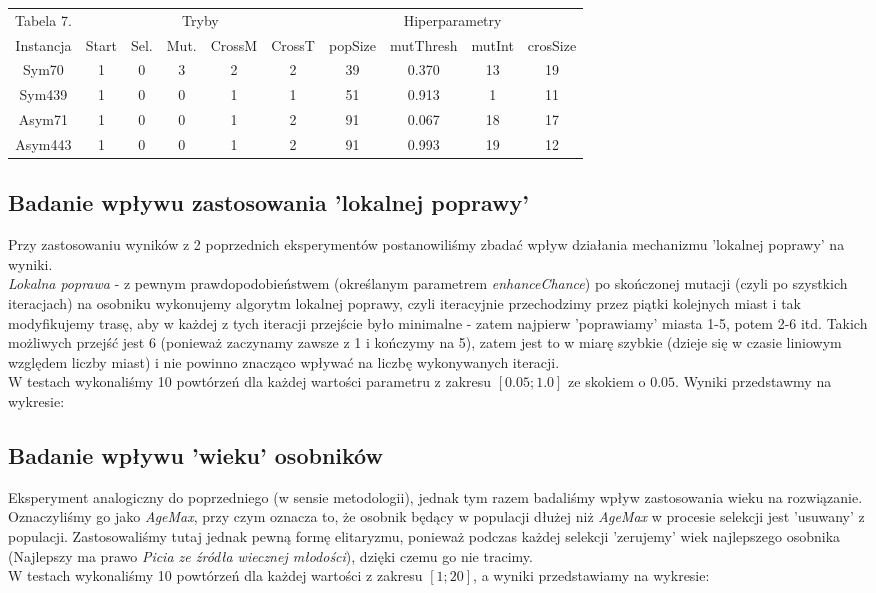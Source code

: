 \documentclass{article}
\begin{document}
\begin{table}[h!]
	\centering
	\begin{tabular}{c||c|c|c|c|c||c|c|c|c}
Tabela 7. & \multicolumn{5}{c}{Tryby} &\multicolumn{4}{c}{Hiperparametry}\\
Instancja & Start & Sel. & Mut. & CrossM & CrossT & popSize & mutThresh & mutInt & crosSize \\
\hline
Sym70 & 1 & 0 & 3 & 2 & 2 & 39 & 0.370 & 13 & 19\\
Sym439 & 1 & 0 & 0 & 1 & 1 & 51 & 0.913 & 1 & 11\\
Asym71 & 1 & 0 & 0 & 1 & 2 & 91 & 0.067 & 18 & 17\\
Asym443 & 1 & 0 & 0 & 1 & 2 & 91 & 0.993 & 19 & 12\\

	\end{tabular}
\end{table}

\subsection{Badanie wpływu zastosowania 'lokalnej poprawy'}
Przy zastosowaniu wyników z 2 poprzednich eksperymentów postanowiliśmy zbadać wpływ działania mechanizmu 'lokalnej poprawy' na wyniki.\\
\textit{Lokalna poprawa} - z pewnym prawdopodobieństwem (określanym parametrem \textit{enhanceChance}) po skończonej mutacji (czyli po szystkich iteracjach) na osobniku wykonujemy algorytm lokalnej poprawy, czyli iteracyjnie przechodzimy przez piątki kolejnych miast i tak modyfikujemy trasę, aby w każdej z tych iteracji przejście było minimalne - zatem najpierw 'poprawiamy' miasta 1-5, potem 2-6 itd. Takich możliwych przejść jest 6 (ponieważ zaczynamy zawsze z 1 i kończymy na 5), zatem jest to w miarę szybkie (dzieje się w czasie liniowym względem liczby miast) i nie powinno znacząco wpływać na liczbę wykonywanych iteracji.\\
W testach wykonaliśmy 10 powtórzeń dla każdej wartości parametru z zakresu $[0.05 ; 1.0]$ ze skokiem o $0.05$. Wyniki przedstawmy na wykresie:

\subsection{Badanie wpływu 'wieku' osobników}
Eksperyment analogiczny do poprzedniego (w sensie metodologii), jednak tym razem badaliśmy wpływ zastosowania wieku na rozwiązanie. Oznaczyliśmy go jako \textit{AgeMax}, przy czym oznacza to, że osobnik będący w populacji dłużej niż \textit{AgeMax} w procesie selekcji jest 'usuwany' z populacji. Zastosowaliśmy tutaj jednak pewną formę elitaryzmu, ponieważ podczas każdej selekcji 'zerujemy' wiek najlepszego osobnika (Najlepszy ma prawo \textit{Picia ze źródła wiecznej młodości}), dzięki czemu go nie tracimy.\\
W testach wykonaliśmy 10 powtórzeń dla każdej wartości z zakresu $[1 ; 20]$, a wyniki przedstawiamy na wykresie:
\end{document}
